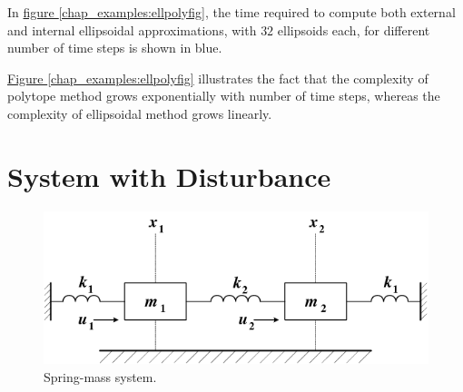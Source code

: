 \documentclass[letterpaper,10pt,english]{sphinxmanual}
\begin{document}
In \hyperref[chap_examples:ellpolyfig]{figure  \ref*{chap_examples:ellpolyfig}}, the time required to compute both external and
internal ellipsoidal approximations, with $32$ ellipsoids each,
for different number of time steps is shown in blue.

\hyperref[chap_examples:ellpolyfig]{Figure  \ref*{chap_examples:ellpolyfig}} illustrates the fact that the complexity of polytope
method grows exponentially with number of time steps, whereas the
complexity of ellipsoidal method grows linearly.


\section{System with Disturbance}
\label{chap_examples:system-with-disturbance}\begin{figure}[htbp]
\centering
\capstart

\includegraphics{springmass.png}
\caption{Spring-mass system.}\label{chap_examples:springmassfig}\end{figure}
\end{document}
